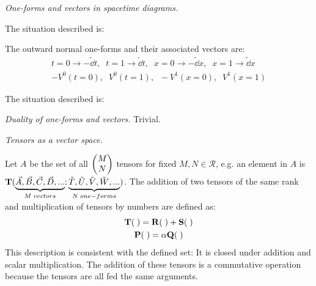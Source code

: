 \documentclass{report}
\begin{document}
\begin{subquests}
	\item \emph{One-forms and vectors in spacetime diagrams.}
	\begin{subquests}
		\item
		The situation described is:
		\begin{center}
		\end{center}
		The outward normal one-forms and their associated vectors are:
		\begin{gather*}
			t = 0 \rightarrow -\tilde{\dd}t, \;\; t = 1 \rightarrow \tilde{\dd}t, \;\; x = 0 \rightarrow -\tilde{\dd}x, \;\; x = 1 \rightarrow \tilde{\dd}x \\
			-V^0(t = 0), \;\; V^0(t = 1), \;\; -V^1(x = 0), \;\; V^1(x = 1)
		\end{gather*}
		
		\item		
		The situation described is:
		\begin{center}
		\end{center}
	\end{subquests}

	\item \emph{Duality of one-forms and vectors.} Trivial.

	\item \emph{Tensors as a vector space.}
	\begin{subquests}
		\item
		Let $A$ be the set of all $\pmqty{M \\ N}$ tensors for fixed $M, N \in \mathcal{R}$, e.g. an element in $A$ is \\
		${\vb T}(\underbrace{\vec A, \vec B, \vec C, \vec D, ...}_{M\;vectors};\underbrace{\tilde T,\tilde U, \tilde V, \tilde W, ...}_{N\;one-forms})$. The addition of two tensors of the same rank and multiplication of tensors by numbers are defined as:
		\begin{gather*}
			{\vb T}(\;) = {\vb R}(\;) + {\vb S}(\;) \\
			{\vb P}(\;) = \alpha {\vb Q}(\;)   
		\end{gather*}
		This description is consistent with the defined set: It is closed under addition and scalar multiplication. The addition of these tensors is a commutative operation because the tensors are all fed the same arguments.
	

\end{subquests}
\end{subquests}
\end{document}
